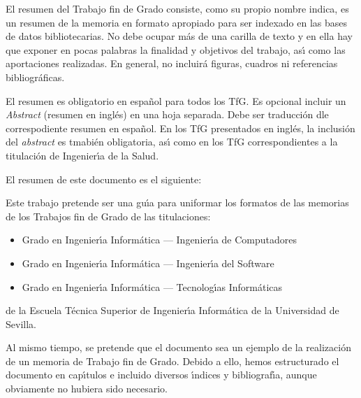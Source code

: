 
El resumen del Trabajo fin de Grado consiste, como su propio nombre indica, es un resumen de la memoria en formato apropiado 
para ser indexado en las bases de datos bibliotecarias. No debe ocupar m\'as de una carilla de texto
y en ella hay que exponer en pocas palabras la finalidad y objetivos del trabajo, 
as{\'\i} como las aportaciones realizadas. En general,
no incluir\'a figuras, cuadros ni referencias bibliogr\'aficas.

El resumen es obligatorio en espa{\~n}ol para todos los TfG. Es opcional incluir un \emph{Abstract} (resumen en ingl\'es)
en una hoja separada. Debe ser traducci\'on dle correspodiente resumen en español. En los TfG presentados en ingl\'es,
la inclusi\'on del \emph{abstract} es tmabi\'en obligatoria, as{\'\i} como en los TfG correspondientes a la titulaci\'on
de Ingenier{\'\i}a de la Salud.

El resumen de este documento es el siguiente:

Este trabajo pretende ser una gu{\'\i}a para uniformar los formatos de las memorias de los Trabajos fin de Grado de las titulaciones: 
\begin{itemize}
\item Grado en Ingenier{\'\i}a Inform\'atica --- Ingenier{\'\i}a de Computadores
\item Grado en Ingenier{\'\i}a Inform\'atica --- Ingenier{\'\i}a del Software
\item Grado en Ingenier{\'\i}a Inform\'atica --- Tecnolog{\'\i}as Inform\'aticas
\end{itemize}

de la Escuela T\'ecnica Superior de Ingenier{\'\i}a Inform\'atica de la Universidad de Sevilla.

Al mismo tiempo, se pretende que el documento sea un ejemplo de la realizaci\'on de un memoria de Trabajo fin de Grado. 
Debido a ello, hemos estructurado el documento en cap{\'\i}tulos e incluido diversos {\'\i}ndices y bibliograf{\'\i}a,
aunque obviamente no hubiera sido necesario.


